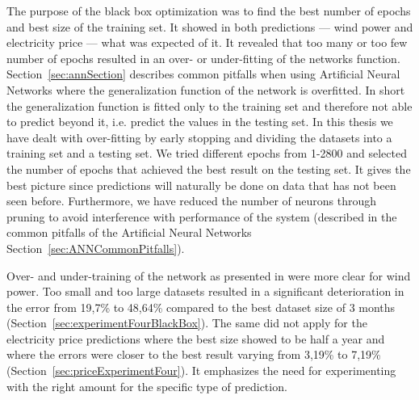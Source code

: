 The purpose of the black box optimization was to find the best number of epochs and best size of the training set. It showed in both predictions --- wind power and electricity price --- what was expected of it. It revealed that too many or too few number of epochs resulted in an over- or under-fitting of the networks function. Section~\ref{sec:annSection} describes common pitfalls when using Artificial Neural Networks where the generalization function of the network is overfitted. In short the generalization function is fitted only to the training set and therefore not able to predict beyond it, i.e. predict the values in the testing set. In this thesis we have dealt with over-fitting by early stopping and dividing the datasets into a training set and a testing set. We tried different epochs from 1-2800 and selected the number of epochs that achieved the best result on the testing set. It gives the best picture since predictions will naturally be done on data that has not been seen before. Furthermore, we have reduced the number of neurons through pruning to avoid interference with performance of the system (described in the common pitfalls of the Artificial Neural Networks Section~\ref{sec:ANNCommonPitfalls}).

Over- and under-training of the network as presented in\cite{1} were more clear for wind power. Too small and too large datasets resulted in a significant deterioration in the error from 19,7\% to 48,64\% compared to the best dataset size of 3 months (Section~\ref{sec:experimentFourBlackBox}). The same did not apply for the electricity price predictions where the best size showed to be half a year and where the errors were closer to the best result varying from 3,19\% to 7,19\% (Section~\ref{sec:priceExperimentFour}). It emphasizes the need for experimenting with the right amount for the specific type of prediction.

